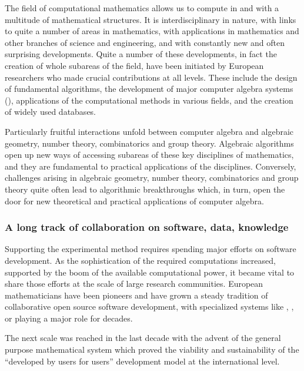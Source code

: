 
The field of computational mathematics allows us to compute in and
with a multitude of mathematical structures. It is interdisciplinary
in nature, with links to quite a number of areas in mathematics, with
applications in mathematics and other branches of science and
engineering, and with constantly new and often surprising
developments. Quite a number of these developments, in fact the
creation of whole subareas of the field, have been initiated by
European researchers who made crucial contributions at all
levels. These include the design of fundamental algorithms, the
development of major computer algebra systems (), applications of the computational methods in
various fields, and the creation of widely used databases.

Particularly fruitful interactions unfold between computer algebra and
algebraic geometry, number theory, combinatorics and group theory. Algebraic algorithms
open up new ways of accessing subareas of these key disciplines of
mathematics, and they are fundamental to practical applications of the
disciplines. Conversely, challenges arising in algebraic geometry, number
theory, combinatorics and group theory quite often lead to algorithmic breakthroughs
which, in turn, open the door for new theoretical and practical applications
of computer algebra.

\subsubsection{A long track of collaboration on software, data, knowledge}

Supporting the experimental method requires spending major efforts
on software development. As the sophistication of the required
computations increased, supported by the boom of the available
computational power, it became vital to share those efforts at the
scale of large research communities. European mathematicians have been
pioneers and have grown a steady tradition of collaborative open
source software development, with specialized systems like \GAP,
\Singular, or \PariGP playing a major role for decades.

The next scale was reached in the last decade with the advent of the
general purpose mathematical system \Sage which proved the viability
and sustainability of the ``developed by users for users'' development
model at the international level.

